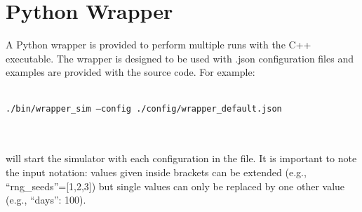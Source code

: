 \section{Python Wrapper}
A Python wrapper is provided to perform multiple runs with the C++ executable.
The wrapper is designed to be used with .json configuration files and examples are provided with the source code.
For example: \\ \\
\centerline{\texttt{./bin/wrapper\_sim --config ./config/wrapper\_default.json}} \\ \\
will start the simulator with each configuration in the file.
It is important to note the input notation: values given inside brackets can be extended (e.g., ``rng\_seeds''=[1,2,3]) but single values can only be replaced by one other value (e.g., ``days'': 100).


